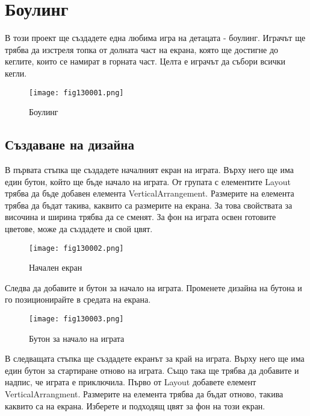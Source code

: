 \chapter{Боулинг}

В този проект ще създадете една любима игра на детацата - боулинг. Играчът ще трябва да изстреля топка от долната част на екрана, която ще достигне до кеглите, които се намират в горната част. Целта е играчът да събори всички кегли.

\begin{figure}[H]
  \centering
  \texttt{[image: fig130001.png]}
  \caption{Боулинг}
\label{fig130001}
\end{figure}

\section{Създаване на дизайна}

В първата стъпка ще създадете началният екран на играта. Върху него ще има един бутон, който ще бъде начало на играта. От групата с елементите Layout трябва да бъде добавен елемента VerticalArrangement. Размерите на елемента трябва да бъдат такива, каквито са размерите на екрана. За това свойствата за височина и ширина трябва да се сменят. За фон на играта освен готовите цветове, може да създадете и свой цвят.

\begin{figure}[H]
  \centering
  \texttt{[image: fig130002.png]}
  \caption{Начален екран}
\label{fig130002}
\end{figure}

Следва да добавите и бутон за начало на играта. Променете дизайна на бутона и го позиционирайте в средата на екрана.

\begin{figure}[H]
  \centering
  \texttt{[image: fig130003.png]}
  \caption{Бутон за начало на играта}
\label{fig130003}
\end{figure}

В следващата стъпка ще създадете екранът за край на играта. Върху него ще има един бутон за стартиране отново на играта. Също така ще трябва да добавите и надпис, че играта е приключила. Първо от Layout добавете елемент VerticalArrangment. Размерите на елемента трябва да бъдат отново, такива каквито са на екрана. Изберете и подходящ цвят за фон на този екран.

